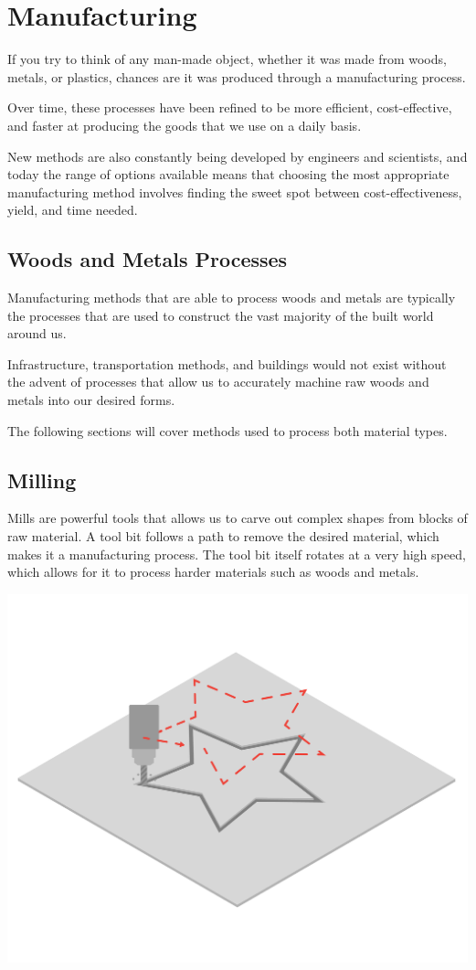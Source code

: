 \chapter{Manufacturing}

If you try to think of any man-made object, whether it was made from woods, metals, or plastics, chances are it was produced through a manufacturing process.

Over time, these processes have been refined to be more efficient, cost-effective, and faster at producing the goods that we use on a daily basis.

New methods are also constantly being developed by engineers and scientists, and today the range of options available means that choosing the most appropriate manufacturing method involves finding the sweet spot between cost-effectiveness, yield, and time needed.

\section{Woods and Metals Processes}

Manufacturing methods that are able to process woods and metals are typically the processes that are used to construct the vast majority of the built world around us. 

Infrastructure, transportation methods, and buildings would not exist without the advent of processes that allow us to accurately machine raw woods and metals into our desired forms.

The following sections will cover methods used to process both material types.

\section{Milling}

Mills are powerful tools that allows us to carve out complex shapes from blocks of raw material. A tool bit follows a path to remove the desired material, which makes it a  manufacturing process. The tool bit itself rotates at a very high speed, which allows for it to process harder materials such as woods and metals.

\includegraphics[width=.75\textwidth]{millWide.png}

